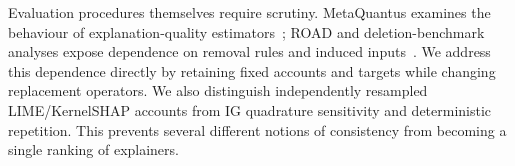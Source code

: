 Evaluation procedures themselves require scrutiny. MetaQuantus examines the
behaviour of explanation-quality estimators~\cite{hedstrom2023metaquantus}; ROAD
and deletion-benchmark analyses expose dependence on removal rules and induced
inputs~\cite{rong2022road,wang2024deletion}. We address this dependence directly
by retaining fixed accounts and targets while changing replacement operators.
We also distinguish independently resampled LIME/KernelSHAP accounts from
IG quadrature sensitivity and deterministic repetition. This prevents several
different notions of consistency from becoming a single ranking of explainers.
